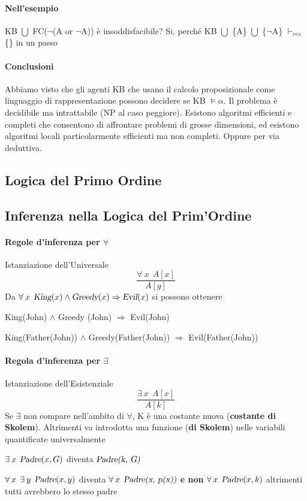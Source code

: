 \documentclass[10pt]{book}
\begin{document}
\paragraph{Nell'esempio} KB $\bigcup$ FC($\neg$(A or $\neg$A)) è insoddisfacibile? Si, perché
KB $\bigcup$ \{A\} $\bigcup$ \{$\neg$A\} $\vdash_{res}$ \{\} in un passo
\paragraph{Conclusioni}
Abbiamo visto che gli agenti KB che usano il calcolo proposizionale come linguaggio di rappresentazione possono decidere se KB $\vDash \alpha$. Il problema è decidibile ma intrattabile (NP al caso peggiore). Esistono algoritmi efficienti e completi che consentono di affrontare problemi di grosse dimensioni, ed esistono algoritmi locali particolarmente efficienti ma non completi. Oppure per via deduttiva.
\subsection{Logica del Primo Ordine}
\subsection{Inferenza nella Logica del Prim'Ordine}
\paragraph{Regole d'inferenza per $\forall$} Istanziazione dell'Universale
$$\frac{\forall\:x\:\:A[x]}{A[g]}$$
Da $\forall\:x\:\:\textsl{King}(x) \wedge \textsl{Greedy}(x) \Rightarrow \textsl{Evil}(x)$ si possono ottenere
\begin{list}{}{}
	\item King(John) $\wedge$ Greedy (John) $\Rightarrow$ Evil(John)
	\item King(Father(John)) $\wedge$ Greedy(Father(John)) $\Rightarrow$ Evil(Father(John))
\end{list}

\paragraph{Regola d'inferenza per $\exists$} Istanziazione dell'Esistenziale
$$\frac{\exists\:x\:\:A[x]}{A[k]}$$
Se $\exists$ non compare nell'ambito di $\forall$, K è una costante nuova (\textbf{costante di Skolem}). Altrimenti va introdotta una funzione (\textbf{di Skolem}) nelle variabili quantificate universalmente
\begin{list}{}{}
	\item $\exists\: x\:\:\textsl{Padre}(x, G)$ diventa $\textsl{Padre(k, G)}$
	\item $\forall\: x\:\:\exists\: y\:\:\textsl{Padre}(x, y)$ diventa $\forall\: x\:\:\textsl{Padre(x, p(x))}$ \textbf{e non} $\forall\: x\:\:\textsl{Padre}(x, k)$ altrimenti tutti avrebbero lo stesso padre
\end{list}
\end{document}
